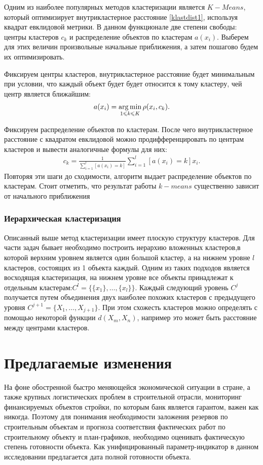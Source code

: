 \documentclass[12pt,a4paper]{article} %
\begin{document}
Одним из наиболее популярных методов кластеризации является $K-Means$, который оптимизирует внутрикластерное расстояние \ref{klastdist1}, используя квадрат евклидовой метрики. В данном функционале две степени свободы: центры кластеров $c_k$ и распределение объектов по кластерам $a(x_i)$. Выберем для этих величин произвольные начальные приближения, а затем пошагово будем их оптимизировать.

Фиксируем центры кластеров, внутрикластерное расстояние будет минимальным при условии, что каждый объект будет будет относится к тому кластеру, чей центр является ближайшим:
\begin{gather}\label{klastdist4}
	a(x_i) = \mathop{\rm arg\,min}\limits_{1\leqslant k\leqslant K} \rho(x_i, c_k).
\end{gather}

Фиксируем распределение объектов по кластерам. После чего внутрикластерное расстояние с квадратом евклидовой можно продифференцировать по центрам кластеров и вывести аналогичные формулы для них:
\begin{gather}\label{klastdist5}
c_k = \frac{1}{\sum\limits_{i=1}^{l}[a(x_i)= k]} \sum\limits_{i=1}^{l}[a(x_i)= k]x_i.
\end{gather}
Повторяя эти шаги до сходимости, алгоритм выдает распределение объектов по кластерам. Стоит отметить, что результат работы $k-means$ существенно зависит от начального приближения

\subsubsection{Иерархическая кластеризация}
Описанный выше метод кластеризации имеет плоскую структуру кластеров. Для части задач бывает необходимо построить иерархию вложенных кластеров,в которой верхним уровнем является один большой кластер, а на нижнем уровне $l$ кластеров, состоящих из 1 объекта каждый. Одним из таких подходов является восходящая кластеризация, на нижнем уровне все объекты принадлежат к отдельным кластерам:$C^l = \{\{x_1\},\dots,\{x_l\}\}$. Каждый следующий уровень $C^j$ получается путем объединения двух наиболее похожих кластеров с предыдущего уровня $C^{j+1}= \{X_1, \dots,X_{j+1}\}$. При этом схожесть кластеров можно определять с помощью некоторой функции $d(X_m, X_n)$, например это может быть расстояние между центрами кластеров.


\newpage
\section{Предлагаемые изменения}
На фоне обостренной быстро меняющейся экономической ситуации в стране, а также крупных логистических проблем в строительной отрасли, мониторинг финансируемых объектов стройки, по которым банк является гарантом, важен как никогда.
Поэтому для понимания необходимости заложения резервов по строительным объектам и прогноза соответствия фактических работ по строительному объекту и план-графиков, необходимо оценивать фактическую степень готовности объекта. Как унифицированный параметр-индикатор в данном исследовании предлагается дата полной готовности объекта.   
\end{document}
